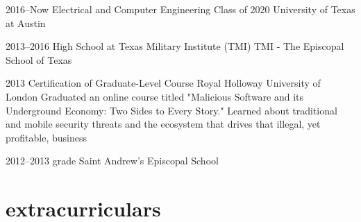 \documentclass[]{friggeri-cv} %
\begin{document}
\begin{entrylist}

	\vspace{-10pt}
	\entry
	{2016--Now}
	{Electrical and Computer Engineering Class of 2020}
	{University of Texas at Austin}


	\vspace{-10pt}
	\entry
	{2013--2016}
	{High School at Texas Military Institute (TMI)}
	{TMI - The Episcopal School of Texas}


	\entry
	{2013}
	{Certification of Graduate-Level Course}
	{Royal Holloway University of London}
	{Graduated an online course titled "Malicious Software and its Underground Economy: Two Sides to Every Story." Learned about traditional and mobile security threats and the ecosystem that drives that illegal, yet profitable, business}


	\vspace{-10pt}
	\entry
	{2012--2013}
	{ grade}
	{Saint Andrew's Episcopal School}

\end{entrylist}

\section{extracurriculars}
\end{document}
